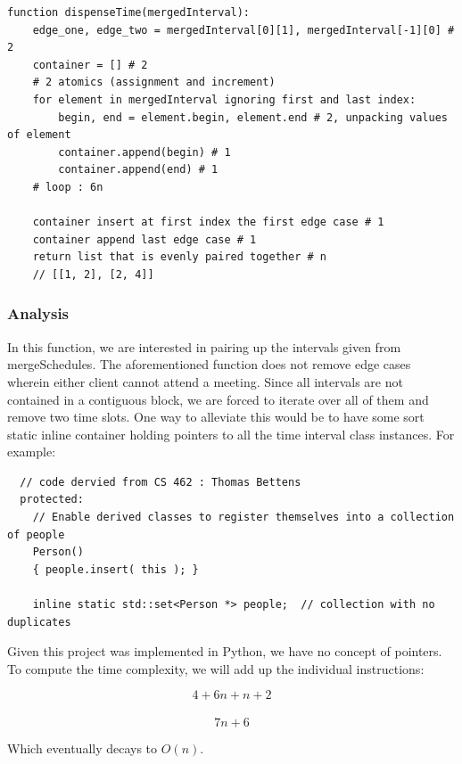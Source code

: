 \documentclass{article}
\begin{document}
\begin{verbatim}
function dispenseTime(mergedInterval):
    edge_one, edge_two = mergedInterval[0][1], mergedInterval[-1][0] # 2
    container = [] # 2
    # 2 atomics (assignment and increment)
    for element in mergedInterval ignoring first and last index:
        begin, end = element.begin, element.end # 2, unpacking values of element
        container.append(begin) # 1
        container.append(end) # 1
    # loop : 6n

    container insert at first index the first edge case # 1
    container append last edge case # 1
    return list that is evenly paired together # n
    // [[1, 2], [2, 4]]

\end{verbatim}

\subsubsection{Analysis}

In this function, we are interested in pairing up the intervals given from mergeSchedules.
The aforementioned function does not remove edge cases wherein either client cannot attend a meeting.
Since all intervals are not contained in a contiguous block, we are forced to iterate over all of them and remove two time slots.
One way to alleviate this would be to have some sort static inline container holding pointers to all the time interval class instances.
For example:

\begin{verbatim}
  // code dervied from CS 462 : Thomas Bettens
  protected:
    // Enable derived classes to register themselves into a collection of people
    Person()
    { people.insert( this ); }

    inline static std::set<Person *> people;  // collection with no duplicates
\end{verbatim}

\begin{flushleft}
Given this project was implemented in Python, we have no concept of pointers.
To compute the time complexity, we will add up the individual instructions:

$$4 + 6n + n + 2$$ \\
$$7n + 6$$

Which eventually decays to $O(n)$.

\end{flushleft}
\end{document}
